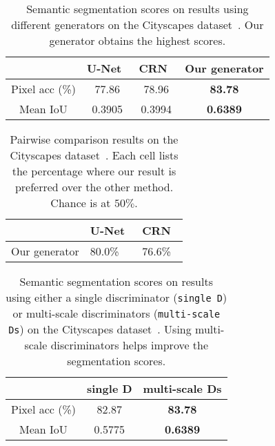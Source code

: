 \documentclass[10pt,twocolumn,letterpaper]{article}
\newcommand{\lbltbl}[1]{\label{tbl:#1}}
\begin{document}
\begin{table}[t!]
\vspace{-.2in}
\centering
\begin{tabular}{  c  c  c  c  }
\toprule
\multicolumn{1}{c}{}
 & U-Net~\cite{ronneberger2015u,isola2016image} & CRN~\cite{chen2017photographic} & Our generator \\ \midrule 
Pixel acc (\%) & 77.86 &  78.96  &  {\bf 83.78} \\
Mean IoU & 0.3905  &  0.3994  &  {\bf 0.6389} \\ \bottomrule 
\end{tabular}
\caption{Semantic segmentation scores on results using different generators on the Cityscapes dataset~\cite{Cordts2016cityscapes}. Our generator obtains the highest scores.}
\lbltbl{seg_G}
\end{table}

\begin{table}[t!]
\setlength{\tabcolsep}{2pt}
\centering
\begin{tabularx}{0.45\textwidth}{c *{2}{Y}} \toprule
& U-Net~\cite{ronneberger2015u,isola2016image} & CRN~\cite{chen2017photographic}   \\ \midrule
Our generator & 80.0\% & 76.6\%  \\ 
\bottomrule 
\end{tabularx}
\caption{Pairwise comparison results on the Cityscapes dataset~\cite{Cordts2016cityscapes}. Each cell lists the percentage where our result is preferred over the other method. Chance is at $50\%$.}
\lbltbl{unlimited_G}
\end{table}

\begin{table}[h!]
\vspace{-.1in}
\centering
\begin{tabularx}{0.38\textwidth}{  c  c  c  }
\toprule
\multicolumn{1}{c}{}
 & single D & multi-scale Ds \\ \midrule 
Pixel acc (\%) & 82.87 &  {\bf 83.78} \\ 
Mean IoU & 0.5775 &  {\bf 0.6389} \\ \bottomrule 
\end{tabularx}
\caption{Semantic segmentation scores on results using either a single discriminator (\texttt{single D}) or multi-scale discriminators (\texttt{multi-scale Ds}) on the Cityscapes dataset~\cite{Cordts2016cityscapes}. Using multi-scale discriminators helps improve the segmentation scores.}
\lbltbl{seg_D}
\end{table}
\end{document}
